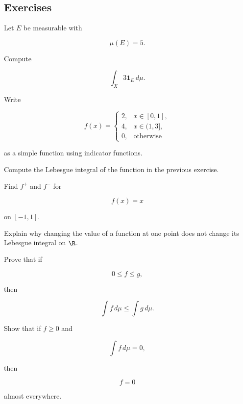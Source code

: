 \subsection{Exercises}
\label{subsec:lebesgue-integration-exercises}

\begin{exercise}[1]
Let \(E\) be measurable with

\[
\mu(E)=5.
\]

Compute

\[
\int_X3\mathbf{1}_E\,d\mu.
\]
\end{exercise}

\begin{exercise}[1]
Write

\[
f(x)
=
\begin{cases}
2, & x\in[0,1],\\
4, & x\in(1,3],\\
0, & \text{otherwise}
\end{cases}
\]

as a simple function using indicator functions.
\end{exercise}

\begin{exercise}[1]
Compute the Lebesgue integral of the function in the previous exercise.
\end{exercise}

\begin{exercise}[1]
Find \(f^+\) and \(f^-\) for

\[
f(x)=x
\]

on \([-1,1]\).
\end{exercise}

\begin{exercise}[1]
Explain why changing the value of a function at one point does not change
its Lebesgue integral on \(\R\).
\end{exercise}

\begin{exercise}[2]
Prove that if

\[
0\leq f\leq g,
\]

then

\[
\int f\,d\mu
\leq
\int g\,d\mu.
\]
\end{exercise}

\begin{exercise}[2]
Show that if \(f\geq0\) and

\[
\int f\,d\mu=0,
\]

then

\[
f=0
\]

almost everywhere.
\end{exercise}

